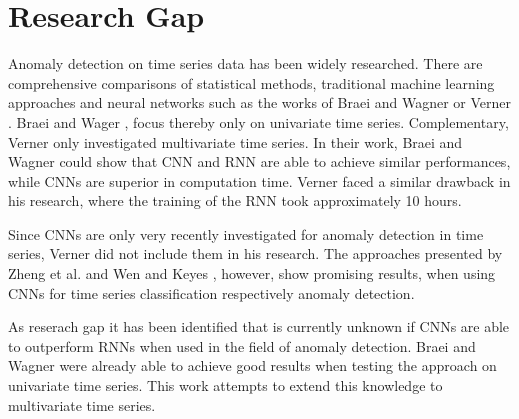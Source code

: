 \section{Research Gap}
Anomaly detection on time series data has been widely researched. There are comprehensive comparisons of statistical methods, traditional machine learning approaches and neural networks such as the works of Braei and Wagner \parencite*{Braei2020} or Verner \parencite*{Verner2019}. Braei and Wager \parencite*{Braei2020}, focus thereby only on univariate time series. Complementary, Verner \parencite*{Verner2019} only investigated multivariate time series. In their work, Braei and Wagner \parencite*{Braei2020} could show that CNN and RNN are able to achieve similar performances, while CNNs are superior in computation time. Verner \parencite*{Verner2019} faced a similar drawback in his research, where the training of the RNN took approximately 10 hours. 

Since CNNs are only very recently investigated for anomaly detection in time series, Verner \parencite*{Verner2019} did not include them in his research. The approaches presented by Zheng et al. \parencite*{Zheng2014} and Wen and Keyes \parencite*{Wen2019}, however, show promising results, when using CNNs for time series classification respectively anomaly detection. 

As reserach gap it has been identified that is currently unknown if CNNs are able to outperform RNNs when used in the field of anomaly detection. Braei and Wagner \parencite*{Braei2020} were already able to achieve good results when testing the approach on univariate time series. This work attempts to extend this knowledge to multivariate time series.



